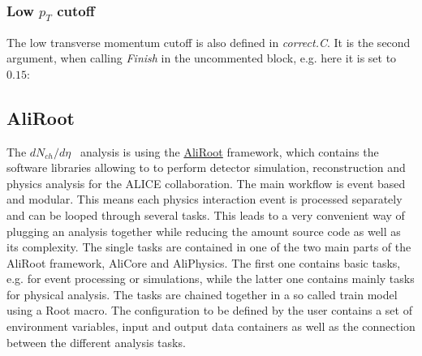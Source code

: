 \documentclass{article}
\newcommand\dNdEta{$dN_{ch}/d\eta$}
\begin{document}
\subsubsection*{Low $p_{T}$ cutoff}
The low transverse momentum cutoff is also defined in \textit{correct.C}. It is the second argument, when calling \textit{Finish} in the uncommented block, e.g. here it is set to $0.15$:


\subsection{AliRoot}
The \dNdEta~ analysis is using the \href{http://aliweb.cern.ch/Offline/AliRoot/Manual.html}{AliRoot} framework, which contains the software libraries allowing to to perform detector simulation, reconstruction and physics analysis for the ALICE collaboration. The main workflow is event based and modular. This means each physics interaction event is processed separately and can be looped through several tasks. This leads to a very convenient way of plugging an analysis together while reducing the amount source code as well as its complexity. The single tasks are contained in one of the two main parts of the AliRoot framework, AliCore and AliPhysics. The first one contains basic tasks, e.g. for event processing or simulations, while the latter one contains mainly tasks for physical analysis. The tasks are chained together in a so called train model using a Root macro. The configuration to be defined by the user contains a set of environment variables, input and output data containers as well as the connection between the different analysis tasks.\\
\end{document}

